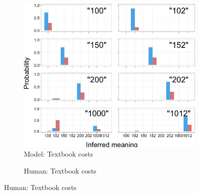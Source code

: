 \documentclass{article} %
\begin{document}


\begin{figure}[t]
        \begin{subfigure}[b]{0.51\textwidth}
                \centering
                \caption{Model: Textbook costs}
                \includegraphics[width=\textwidth]{model_textbook_all.png}
	\end{subfigure}
        \begin{subfigure}[b]{0.51\textwidth}
                \centering
                \caption{Human: Textbook costs}

\end{subfigure}
\end{figure}
\end{document}
